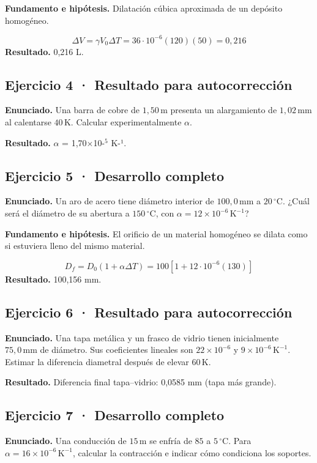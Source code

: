 \documentclass[11pt,a4paper]{article}
\begin{document}
\textbf{Fundamento e hipótesis.} Dilatación cúbica aproximada de un depósito homogéneo.

\[
\Delta V=\gamma V_0\Delta T=36\cdot10^{-6}(120)(50)=0{,}216
\]
\textbf{Resultado.} 0,216 L.


\subsection*{Ejercicio 4 · Resultado para autocorrección}
\textbf{Enunciado.} Una barra de cobre de \(1{,}50\,\mathrm m\) presenta un alargamiento de \(1{,}02\,\mathrm{mm}\) al calentarse \(40\,\mathrm K\). Calcular experimentalmente \(\alpha\).

\textbf{Resultado.} \ensuremath{\alpha} = 1,70\ensuremath{\times}10-\ensuremath{^5} K-¹.


\subsection*{Ejercicio 5 · Desarrollo completo}
\textbf{Enunciado.} Un aro de acero tiene diámetro interior de \(100{,}0\,\mathrm{mm}\) a \(20\,^\circ\mathrm C\). ¿Cuál será el diámetro de su abertura a \(150\,^\circ\mathrm C\), con \(\alpha=12\times10^{-6}\,\mathrm K^{-1}\)?

\textbf{Fundamento e hipótesis.} El orificio de un material homogéneo se dilata como si estuviera lleno del mismo material.

\[
D_f=D_0(1+\alpha\Delta T)=100[1+12\cdot10^{-6}(130)]
\]
\textbf{Resultado.} 100,156 mm.


\subsection*{Ejercicio 6 · Resultado para autocorrección}
\textbf{Enunciado.} Una tapa metálica y un frasco de vidrio tienen inicialmente \(75{,}0\,\mathrm{mm}\) de diámetro. Sus coeficientes lineales son \(22\times10^{-6}\) y \(9\times10^{-6}\,\mathrm K^{-1}\). Estimar la diferencia diametral después de elevar \(60\,\mathrm K\).

\textbf{Resultado.} Diferencia final tapa–vidrio: 0,0585 mm (tapa más grande).


\subsection*{Ejercicio 7 · Desarrollo completo}
\textbf{Enunciado.} Una conducción de \(15\,\mathrm m\) se enfría de \(85\) a \(5\,^\circ\mathrm C\). Para \(\alpha=16\times10^{-6}\,\mathrm K^{-1}\), calcular la contracción e indicar cómo condiciona los soportes.
\end{document}
